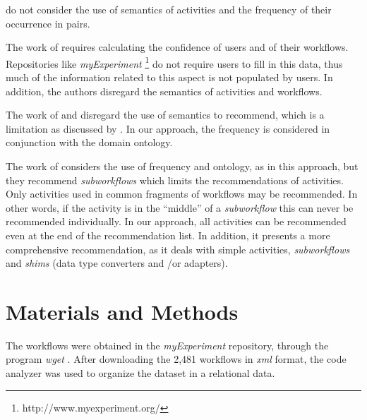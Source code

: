 \documentclass[10pt,letterpaper]{article}
\begin{document}
 do not consider the use of semantics of activities and the frequency of their occurrence in pairs.

The work of  requires calculating the confidence of users and of their workflows. Repositories like \emph{myExperiment} \footnote{http://www.myexperiment.org/} do not require users to fill in this data, thus much of the information related to this aspect is not populated by users. In addition, the authors disregard the semantics of activities and workflows.

The work of  and  disregard the use of semantics to recommend, which is a limitation as discussed by . In our approach, the frequency is considered in conjunction with the domain ontology.

The work of  considers the use of frequency and ontology, as in this approach, but they recommend \emph{subworkflows} which limits the recommendations of activities. Only activities used in common fragments of workflows may be recommended. In other words, if the activity is in the ``middle'' of a \emph{subworkflow} this can never be recommended individually. In our approach, all activities can be recommended even at the end of the recommendation list. In addition, it presents a more comprehensive recommendation, as it deals with simple activities, \emph{subworkflows} and \emph{shims} (data type converters and /or adapters).

\section*{Materials and Methods} \label{mat_met}
%

The workflows were obtained in the \emph{myExperiment} \cite{ROURE2015} repository, through the program \emph{wget} \cite{wget2015}. After downloading the 2,481 workflows in \emph{xml} format, the \cite{BeautifulSoup2015} code analyzer was used to organize the dataset in a relational data.
\end{document}

